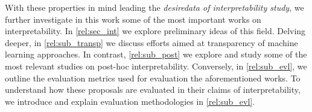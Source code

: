With these properties in mind leading the \emph{desiredata of interpretability study}, we further 
investigate in this work some of the most important works on interpretability. In 
\autoref{rel:sec_int} we explore preliminary ideas of this field. Delving deeper, in 
\autoref{rel:sub_transp} we discuss efforts aimed at transparency of machine learning approaches. 
In contrast, \autoref{rel:sub_post} we explore and study 
some of the most relevant studies on post-hoc interpretability. Conversely, in 
\autoref{rel:sub_evl}, we outline the evaluation metrics used for evaluation the aforementioned 
works. To understand how these proposals are evaluated in their claims of interpretability, we 
introduce and explain evaluation methodologies in \autoref{rel:sub_evl}.

\newpage

